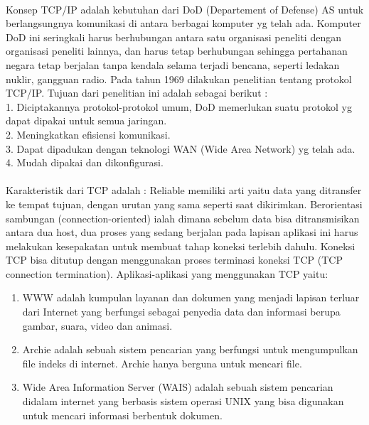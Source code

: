 \documentclass[12pt,a4paper]{article}
\begin{document}
\paragraph{}
\hspace{1cm}
Konsep TCP/IP adalah kebutuhan dari DoD (Departement of Defense) AS untuk berlangsungnya komunikasi di antara berbagai komputer yg telah ada. Komputer DoD ini seringkali harus berhubungan antara satu organisasi peneliti dengan organisasi peneliti lainnya, dan harus tetap berhubungan sehingga pertahanan negara tetap berjalan tanpa kendala selama terjadi bencana, seperti ledakan nuklir, gangguan radio. Pada tahun 1969 dilakukan penelitian tentang protokol TCP/IP. Tujuan dari penelitian ini adalah sebagai berikut :\\
1.	Diciptakannya protokol-protokol umum, DoD memerlukan suatu protokol yg dapat dipakai untuk semua jaringan. \\
2.	Meningkatkan efisiensi komunikasi. \\
3.	Dapat dipadukan dengan teknologi WAN (Wide Area Network) yg telah ada. \\
4.	Mudah dipakai dan dikonfigurasi. \\


\paragraph{}
\hspace{1cm}
Karakteristik dari TCP adalah :
Reliable memiliki arti yaitu data yang ditransfer ke tempat tujuan,  dengan urutan yang sama seperti saat dikirimkan.
Berorientasi sambungan (connection-oriented) ialah dimana sebelum data bisa ditransmisikan antara dua host, dua proses yang sedang berjalan pada lapisan aplikasi ini harus melakukan kesepakatan untuk membuat tahap koneksi terlebih dahulu. Koneksi TCP bisa ditutup dengan menggunakan proses terminasi koneksi TCP (TCP connection termination). Aplikasi-aplikasi yang menggunakan TCP yaitu:

\begin{enumerate}
\item WWW adalah kumpulan layanan dan dokumen yang menjadi lapisan terluar dari Internet yang berfungsi sebagai penyedia data dan informasi berupa gambar, suara, video dan animasi. 
\item Archie adalah sebuah sistem pencarian  yang berfungsi untuk mengumpulkan file indeks di internet. Archie hanya berguna untuk mencari file. 
\item Wide Area Information Server (WAIS) adalah sebuah sistem pencarian didalam internet yang berbasis sistem operasi UNIX yang bisa digunakan untuk mencari informasi berbentuk dokumen.\\
\end{enumerate}
\end{document}
